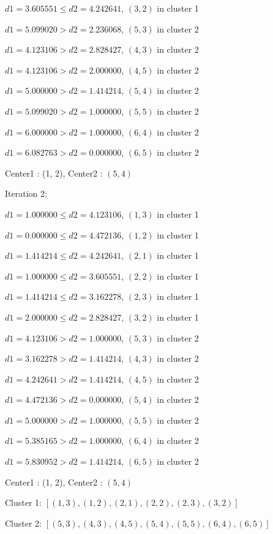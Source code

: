 \documentclass[11pt]{article}
\begin{document}
\begin{enumerate}
\begin{enumerate}[a.]
	$d1 = 3.605551 \leq d2 = 4.242641$, $(3, 2)$ in cluster 1

	$d1 = 5.099020 > d2 = 2.236068$, $(5, 3)$ in cluster 2

	$d1 = 4.123106 > d2 = 2.828427$, $(4, 3)$ in cluster 2

	$d1 = 4.123106 > d2 = 2.000000$, $(4, 5)$ in cluster 2

	$d1 = 5.000000 > d2 = 1.414214$, $(5, 4)$ in cluster 2

	$d1 = 5.099020 > d2 = 1.000000$, $(5, 5)$ in cluster 2

	$d1 = 6.000000 > d2 = 1.000000$, $(6, 4)$ in cluster 2

	$d1 = 6.082763 > d2 = 0.000000$, $(6, 5)$ in cluster 2

	Center1 : (1, 2), Center2 : $(5, 4)$

Iteration 2:

	$d1 = 1.000000 \leq d2 = 4.123106$, $(1, 3)$ in cluster 1

	$d1 = 0.000000 \leq d2 = 4.472136$, $(1, 2)$ in cluster 1

	$d1 = 1.414214 \leq d2 = 4.242641$, $(2, 1)$ in cluster 1

	$d1 = 1.000000 \leq d2 = 3.605551$, $(2, 2)$ in cluster 1

	$d1 = 1.414214 \leq d2 = 3.162278$, $(2, 3)$ in cluster 1

	$d1 = 2.000000 \leq d2 = 2.828427$, $(3, 2)$ in cluster 1

	$d1 = 4.123106 > d2 = 1.000000$, $(5, 3)$ in cluster 2

	$d1 = 3.162278 > d2 = 1.414214$, $(4, 3)$ in cluster 2

	$d1 = 4.242641 > d2 = 1.414214$, $(4, 5)$ in cluster 2

	$d1 = 4.472136 > d2 = 0.000000$, $(5, 4)$ in cluster 2

	$d1 = 5.000000 > d2 = 1.000000$, $(5, 5)$ in cluster 2

	$d1 = 5.385165 > d2 = 1.000000$, $(6, 4)$ in cluster 2

	$d1 = 5.830952 > d2 = 1.414214$, $(6, 5)$ in cluster 2

	Center1 : (1, 2), Center2 : $(5, 4)$

Cluster 1: $[(1, 3), (1, 2), (2, 1), (2, 2), (2, 3), (3, 2)]$

Cluster 2: $[(5, 3), (4, 3), (4, 5), (5, 4), (5, 5), (6, 4), (6, 5)]$


\end{enumerate}
\end{enumerate}
\end{document}
